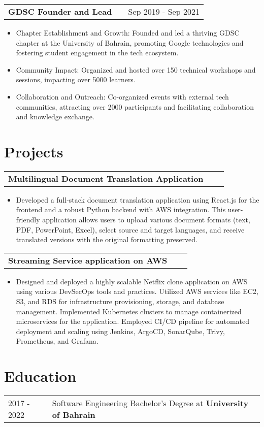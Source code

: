 \documentclass[a4paper,11pt]{article}
\makeatletter
\newenvironment{joblong}[2]
    {
    \begin{tabularx}{\linewidth}{@{}l X r@{}}
    \textbf{#1} & \hfill &  #2 \\[3.75pt]
    \end{tabularx}
    \begin{minipage}[t]{\linewidth}
    \begin{itemize}[nosep,after=\strut, leftmargin=1em, itemsep=3pt,label=--]
    }
    {
    \end{itemize}
    \end{minipage}    
    }
\newenvironment{projectlong}[2]
    {
    \begin{tabularx}{\linewidth}{@{}l X r@{}}
    \textbf{#1} & \hfill &  #2 \\[3.75pt]
    \end{tabularx}
    \begin{minipage}[t]{\linewidth}
    \begin{itemize}[nosep,after=\strut, leftmargin=1em, itemsep=3pt,label=--]
    }
    {
    \end{itemize}
    \end{minipage}    
    }
\makeatother
\begin{document}
\begin{joblong}{GDSC Founder and Lead}{Sep 2019 - Sep 2021}
\item Chapter Establishment and Growth: Founded and led a thriving GDSC chapter at the University of Bahrain, promoting Google technologies and fostering student engagement in the tech ecosystem.
\item Community Impact: Organized and hosted over 150 technical workshops and sessions, impacting over 5000 learners.
\item Collaboration and Outreach: Co-organized events with external tech communities, attracting over 2000 participants and facilitating collaboration and knowledge exchange.

\end{joblong}
  
\section{Projects}

\begin{projectlong}{Multilingual Document Translation Application}{}
    \item Developed a full-stack document translation application using React.js for the frontend and a robust Python backend with AWS integration. This user-friendly application allows users to upload various document formats (text, PDF, PowerPoint, Excel), select source and target languages, and receive translated versions with the original formatting preserved.
\end{projectlong}

\begin{projectlong}{Streaming Service application on AWS }{}
    \item Designed and deployed a highly scalable Netflix clone application on AWS using various DevSecOps tools and practices.
Utilized AWS services like EC2, S3, and RDS for infrastructure provisioning, storage, and database management.
Implemented Kubernetes clusters to manage containerized microservices for the application. Employed CI/CD  pipeline for automated deployment and scaling using Jenkins, ArgoCD, SonarQube, Trivy, Prometheus, and Grafana.
\end{projectlong}


\section{Education}
\begin{tabularx}{\linewidth}{@{}l X@{}}	
2017 - 2022 & Software Engineering Bachelor's Degree at \textbf{University of Bahrain}  \\ 
\end{tabularx}
\end{document}
